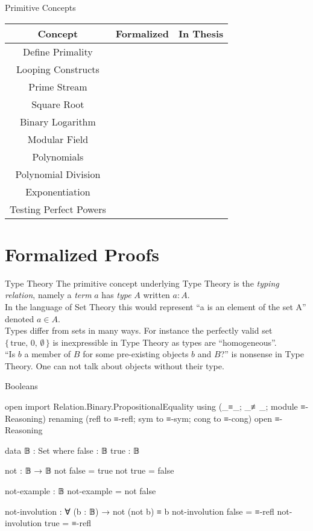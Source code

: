 \documentclass{beamer}
\newcommand{\cmark}{\text{\ding{51}}}
\newcommand{\xmark}{\text{\ding{55}}}
\begin{document}
\begin{frame}{Primitive Concepts}
  \begin{center}
    \begin{tabular}{c|c|c}
      Concept & Formalized & In Thesis \\
      \hline
      Define Primality & \cmark & \cmark \\
      Looping Constructs & \cmark & \cmark \\
      Prime Stream & \cmark & \cmark \\
      Square Root & \xmark & \xmark \\
      Binary Logarithm & \cmark & \cmark \\
      Modular Field & \cmark & \xmark \\
      Polynomials & \cmark & \xmark \\
      Polynomial Division & \cmark & \xmark \\
      Exponentiation & \cmark & \cmark \\
      Testing Perfect Powers & \xmark & \xmark \\
    \end{tabular}
  \end{center}
\end{frame}

\section{Formalized Proofs}

\begin{frame}{Type Theory}
The primitive concept underlying Type Theory is the \textit{typing relation},
namely a \textit{term} $a$ has \textit{type} $A$ written $a : A$. \\
In the language of Set Theory this would represent ``a is an element of the set A''
denoted $a \in A$. \\
Types differ from sets in many ways. For instance the perfectly valid set
$\{ \, \text{true}, \, 0, \, \emptyset \, \}$
is inexpressible in Type Theory as types are ``homogeneous''. \\
``Is $b$ a member of $B$ for some pre-existing objects $b$ and $B$?'' is
nonsense in Type Theory. One can not talk about objects without their type.
\end{frame}

\begin{frame}{Booleans}
  \begin{code}[hide]
    open import Relation.Binary.PropositionalEquality
      using (_≡_; _≢_; module ≡-Reasoning)
      renaming (refl to ≡-refl; sym to ≡-sym; cong to ≡-cong)
    open ≡-Reasoning
  \end{code}
  \begin{code}
    data 𝔹 : Set where
      false : 𝔹
      true  : 𝔹

    not : 𝔹 → 𝔹
    not false = true
    not true  = false

    not-example : 𝔹
    not-example = not false
    
    not-involution : ∀ (b : 𝔹) → not (not b) ≡ b
    not-involution false = ≡-refl
    not-involution true = ≡-refl
  \end{code}
\end{frame}
\end{document}
